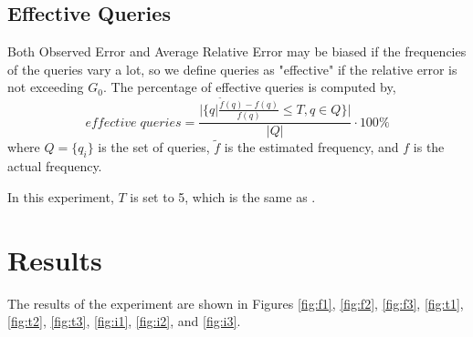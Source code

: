 \subsection{Effective Queries \cite{DBLP}}
Both Observed Error and Average Relative Error may be biased if the frequencies of the queries vary a lot, so we define queries as "effective" if the relative error is not exceeding $G_0$. The percentage of effective queries is computed by,
\[
effective\;queries = \frac{|\{q|\frac{\tilde{f}(q)-f(q)}{f(q)} \leq T, q \in Q\}|}{|Q|} \cdot 100\%
\]
where $Q = \{q_i\}$ is the set of queries, $\tilde{f}$ is the estimated frequency, and $f$ is the actual frequency.

In this experiment, $T$ is set to 5, which is the same as \cite{DBLP}.


\section{Results}
The results of the experiment are shown in Figures \ref{fig:f1}, \ref{fig:f2}, \ref{fig:f3}, \ref{fig:t1}, \ref{fig:t2}, \ref{fig:t3}, \ref{fig:i1}, \ref{fig:i2}, and \ref{fig:i3}.

